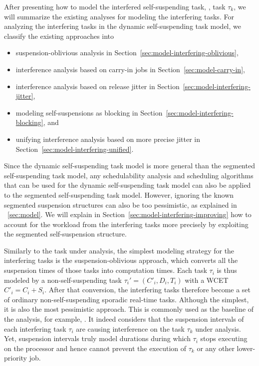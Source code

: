 After presenting how to model the interfered self-suspending task, \ie, task $\tau_k$, we will summarize the existing analyses for modeling the interfering tasks. For analyzing the interfering tasks in the dynamic self-suspending task model, we classify the existing approaches into 
\begin{itemize}
\item suspension-oblivious analysis in Section~\ref{sec:model-interfering-oblivious}, 
\item interference analysis based on carry-in jobs in Section~\ref{sec:model-carry-in},
\item interference analysis based on release jitter in Section~\ref{sec:model-interfering-jitter},
\item modeling self-suspensions as blocking in Section~\ref{sec:model-interfering-blocking}, and
\item unifying interference analysis based on more precise jitter in Section~\ref{sec:model-interfering-unified}.
\end{itemize}
Since the dynamic self-suspending task model is more general than the segmented self-suspending task model, any schedulability analysis and scheduling algorithms that can be used for the dynamic self-suspending task model can also be applied to the segmented self-suspending task model. However, ignoring the known segmented suspension structures can also be too pessimistic, as explained in \mysectionref{}~\ref{sec:model}. We will explain in Section~\ref{sec:model-interfering-improving} how to account for the workload from the interfering tasks more precisely by exploiting the segmented self-suspension structure.

\label{sec:model-interfering-oblivious}

Similarly to the task under analysis, the simplest modeling strategy for the interfering tasks is the suspension-oblivious approach, which converts all the suspension times of those tasks into computation times. Each task $\tau_i$ is thus modeled by a non-self-suspending task $\tau_i' = (C'_i, D_i, T_i)$ with a WCET $C'_i = C_i+S_i$. After that conversion, the interfering tasks therefore become a set of ordinary non-self-suspending sporadic real-time tasks. Although the simplest, it is also the most pessimistic approach. This is commonly used as the baseline of the analysis, for example, \cite{DBLP:conf/ecrts/LiuA13,bbb-2011}.
It indeed considers that the suspension intervals of each interfering task $\tau_i$ are causing interference on the task $\tau_k$ under analysis. Yet, suspension intervals truly model durations during which $\tau_i$ stops executing on the processor and hence cannot prevent the execution of $\tau_k$ or any other lower-priority job.


